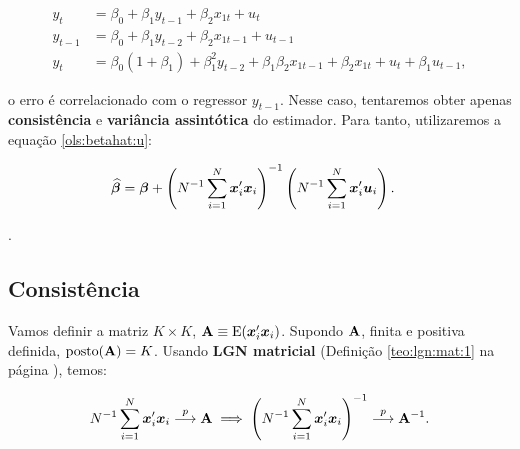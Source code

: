 \documentclass[11pt, oneside, a4paper, article]{article}
\numberwithin{equation}{section}
\begin{document}
\vspace{-1 em}
\begin{align*}
	y_{t} &= \beta_{0} + \beta_{1} y_{t-1} + \beta_{2} x_{1t} + u_{t}
	\\
	y_{t-1} &= \beta_{0} + \beta_{1} y_{t-2} + \beta_{2} x_{1t-1} + u_{t-1}
	\\
	y_{t} &=
	\beta_{0}(1 + \beta_{1})
	+
	\beta_{1}^2 y_{t-2}
	+
	\beta_{1} 
	\beta_{2} x_{1t-1} 
	+
	\beta_{2} x_{1t} 
	+
	u_{t}
	+
	\beta_{1} u_{t-1},
\end{align*}

\noindent
o erro é correlacionado com o regressor $y_{t-1}$.
Nesse caso, tentaremos obter apenas \textbf{consistência} e \textbf{variância assintótica} do estimador.
Para tanto, utilizaremos a equação \eqref{ols:betahat:u}: 

\vspace{-1 em}
\begin{align*}
	\widehat{\boldsymbol{\beta}} &= 
	\boldsymbol{\beta} +
	\left( N^{-1} \sum_{i=1}^{N} \boldsymbol{x}_{i}' \boldsymbol{x}_{i} \right)^{-1}
	\left( N^{-1} \sum_{i=1}^{N} \boldsymbol{x}_{i}' \boldsymbol{u}_{i} \right).
\end{align*}

\vspace{1 em}
\begin{center}
	\Large{.}
\end{center}
\vspace{1 em}

\subsection{Consistência}
Vamos definir a matriz $K \times K$, $\mathbf{A} \equiv \text{E}(\boldsymbol{x}_{i}' \boldsymbol{x}_{i})$.
Supondo $\mathbf{A}$, finita e positiva definida, $\text{posto}(\mathbf{A}) = K$.
Usando \textbf{LGN matricial} (Definição \ref{teo:lgn:mat:1} na página \pageref{teo:lgn:mat:1}), temos: 

\noindent
{}

\vspace{-1 em}
\begin{align} \label{eq:Amat}
	N^{-1} \sum_{i=1}^{N} \boldsymbol{x}_{i}' \boldsymbol{x}_{i}
	 \overset{p}{\longrightarrow}  \mathbf{A}
	\implies
	\left( N^{-1} \sum_{i=1}^{N} \boldsymbol{x}_{i}' \boldsymbol{x}_{i} \right)^{-1}
	 \overset{p}{\longrightarrow}  \mathbf{A}^{-1}.
\end{align}
\end{document}
